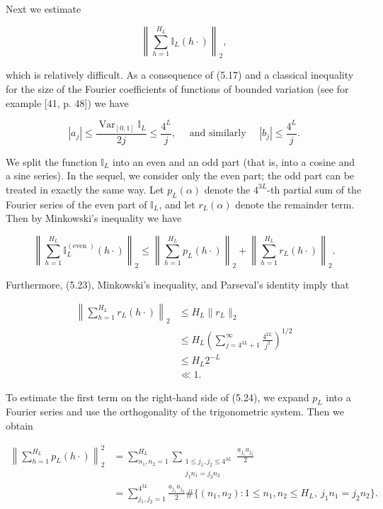 \documentclass[10pt]{article}
\newcommand{\1}{\mathbf{1}}
\begin{document}
Next we estimate

$$
\left\|\sum_{h=1}^{H_{L}} \mathbb{I}_{L}(h \cdot)\right\|_{2},
$$

which is relatively difficult. As a consequence of (5.17) and a classical inequality for the size of the Fourier coefficients of functions of bounded variation (see for example [41, p. 48]) we have


\begin{equation*}
\left|a_{j}\right| \leqslant \frac{\operatorname{Var}_{[0,1]}\mathbb I_L}{2j} \leqslant \frac{4^{L}}{j}, \quad \text { and similarly } \quad\left|b_{j}\right| \leqslant \frac{4^{L}}{j} . \tag{5.23}
\end{equation*}


We split the function $\mathbb{I}_{L}$ into an even and an odd part (that is, into a cosine and a sine series). In the sequel, we consider only the even part; the odd part can be treated in exactly the same way. Let $p_{L}(\alpha)$ denote the $4^{3 L}$-th partial sum of the Fourier series of the even part of $\mathbb{I}_{L}$, and let $r_{L}(\alpha)$ denote the remainder term. Then by Minkowski's inequality we have


\begin{equation*}
\left\|\sum_{h=1}^{H_{L}} \mathbb{I}_{L}^{(\text {even })}(h \cdot)\right\|_{2} \leqslant\left\|\sum_{h=1}^{H_{L}} p_{L}(h \cdot)\right\|_{2}+\left\|\sum_{h=1}^{H_{L}} r_{L}(h \cdot)\right\|_{2} . \tag{5.24}
\end{equation*}


Furthermore, (5.23), Minkowski's inequality, and Parseval's identity imply that

\begin{equation*}
\begin{aligned}
\left\|\sum_{h=1}^{H_L}r_L(h\cdot)\right\|_2
&\leqslant H_L\|r_L\|_2\\
&\leqslant H_L\left(\sum_{j=4^{3L}+1}^{\infty}\frac{4^{2L}}{j^2}\right)^{1/2}\\
&\leqslant H_L2^{-L}\\
&\ll1.
\end{aligned}
\tag{5.25}
\end{equation*}

To estimate the first term on the right-hand side of (5.24), we expand $p_{L}$ into a Fourier series and use the orthogonality of the trigonometric system. Then we obtain


\begin{align*}
\left\|\sum_{h=1}^{H_L}p_L(h\cdot)\right\|_2^2
&=\sum_{n_1,n_2=1}^{H_L}
  \sum_{\substack{1\leqslant j_1,j_2\leqslant4^{3L}\\j_1n_1=j_2n_2}}
  \frac{a_{j_1}a_{j_2}}2 \tag{5.26}\\
&=\sum_{j_1,j_2=1}^{4^{3L}}\frac{a_{j_1}a_{j_2}}2
 \#\{(n_1,n_2):1\leqslant n_1,n_2\leqslant H_L,\ j_1n_1=j_2n_2\}.
\end{align*}
\end{document}
